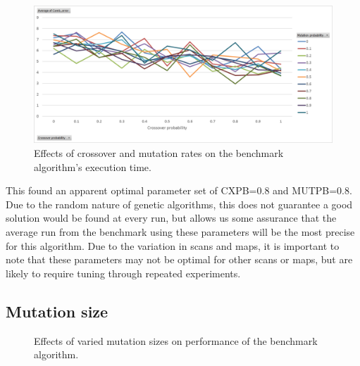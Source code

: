 \documentclass[authoryearcitations]{UoYCSproject}
\begin{document}
\begin{figure}[]
\centering
	\includegraphics[width=12cm,keepaspectratio]{images/ga_cxpb_mutpb.png}
	\caption[Optimising cross and mutation rate for benchmark algorithm.]{Effects of crossover and mutation rates on the benchmark algorithm's execution time.}
	\label{fig:ga_cxpb_mutpb}
\end{figure}

 This found an apparent optimal parameter set of CXPB=0.8 and MUTPB=0.8. Due to the random nature of genetic algorithms, this does not guarantee a good solution would be found at every run, but allows us some assurance that the average run from the benchmark using these parameters will be the most precise for this algorithm. Due to the variation in scans and maps, it is important to note that these parameters may not be optimal for other scans or maps, but are likely to require tuning through repeated experiments. 


\subsection{Mutation size}

\datatablebenchmarkmutsize

\begin{figure}
	\centering
	\caption[Optimising mutation step size for the benchmark algorithm.]{Effects of varied mutation sizes on performance of the benchmark algorithm.}
	\label{fig:benchmark_mutsize}
\end{figure}
\end{document}
